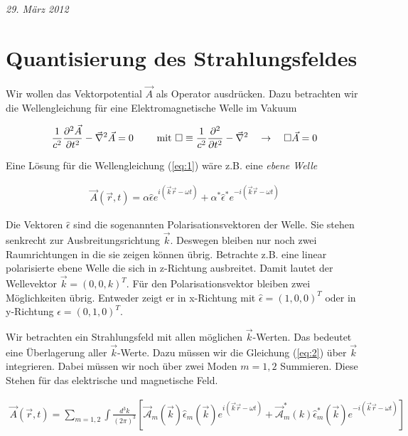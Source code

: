 
\usepackage{amsmath}                %
\usepackage{amsfonts}




\textit{29. März 2012}


\section*{Quantisierung des Strahlungsfeldes}

Wir wollen das Vektorpotential \(\vec A\) als Operator ausdrücken. Dazu betrachten wir die Wellengleichung für eine Elektromagnetische Welle im Vakuum

\begin{align}
  \label{eq:1}
  \frac{1}{c^2}\pdiff^2{\vec A}_t - \vec \nabla^2\vec A = 0 \qquad \text{ mit }\square\equiv\frac{1}{c^2}\pdiff^2_t - \vec \nabla^2\quad\to\quad\square\vec A = 0
\end{align}

Eine Lösung für die Wellengleichung (\ref{eq:1}) wäre z.B. eine \textit{ebene Welle}

\begin{align}
  \label{eq:2}
  \vec A(\vec r, t) = \alpha\hat \epsilon e^{i(\vec k\vec r -\omega t)} + \alpha^*\hat \epsilon^* e^{-i(\vec k\vec r-\omega t)} 
\end{align}

Die Vektoren \(\hat \epsilon\) sind die sogenannten Polarisationsvektoren der Welle. Sie stehen senkrecht zur Ausbreitungsrichtung \(\vec k\). Deswegen bleiben nur noch zwei Raumrichtungen in die sie zeigen können übrig. Betrachte z.B. eine linear polarisierte ebene Welle die sich in z-Richtung ausbreitet. Damit lautet der Wellevektor \(\vec k = (0,0,k)^T\). Für den Polarisationsvektor bleiben zwei Möglichkeiten übrig. Entweder zeigt er in x-Richtung mit \(\hat \epsilon=(1,0,0)^T\) oder in y-Richtung \(\hat \epsilon=(0,1,0)^T\).

Wir betrachten ein Strahlungsfeld mit allen möglichen \(\vec k\)-Werten. Das bedeutet eine Überlagerung aller \(\vec k\)-Werte. Dazu müssen wir die Gleichung (\ref{eq:2}) über \(\vec k\) integrieren. Dabei müssen wir noch über zwei Moden \(m=1,2\) Summieren. Diese Stehen für das elektrische und magnetische Feld.

\begin{align}
  \label{eq:3}
\vec A(\vec r, t) =\sum_{m=1,2}\int\frac{d^3k}{(2\pi)^3} \left[  \vec{\mathcal A}_m (\vec k) \hat \epsilon_m (\vec k) e^{i(\vec k\vec r-\omega t)} + \vec{\mathcal A}^*_m (k)\hat\epsilon^*_m(\vec k) e^{-i(\vec k\vec r-\omega t)}\right]
\end{align}

